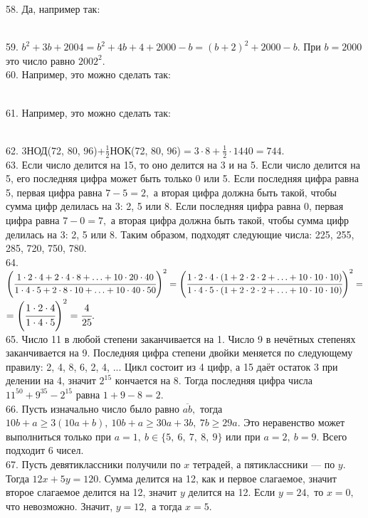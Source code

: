 58. Да, например так:
\begin{figure}[ht!]
\end{figure}\\
59. $b^2+3b+2004=b^2+4b+4+2000-b=(b+2)^2+2000-b.$ При $b=2000$ это число равно $2002^2.$\\
60. Например, это можно сделать так:
\begin{figure}[ht!]
\end{figure}\\
61. Например, это можно сделать так:
\begin{figure}[ht!]
\end{figure}\\
62. 3НОД(72, 80, 96)+$\frac{1}{2}$НОК(72, 80, 96)$=3\cdot8+\frac{1}{2}\cdot1440=744.$\\
63. Если число делится на 15, то оно делится на 3 и на 5. Если число делится на 5, его последняя цифра может быть только 0 или 5. Если последняя цифра равна 5, первая цифра равна $7-5=2,$ а вторая цифра должна быть такой, чтобы сумма цифр делилась на 3: 2, 5 или 8. Если последняя цифра равна 0, первая цифра равна $7-0=7,$ а вторая цифра должна быть такой, чтобы сумма цифр делилась на 3: 2, 5 или 8. Таким образом, подходят следующие числа: 225, 255, 285, 720, 750, 780.\\
64. $\left( \cfrac{1\cdot2\cdot4+2\cdot4\cdot8+\ldots+10\cdot20\cdot40}{1\cdot4\cdot5+2\cdot8\cdot10+\ldots+10\cdot40\cdot50}\right)^2=
\left( \cfrac{1\cdot2\cdot4\cdot(1+2\cdot2\cdot2+\ldots+10\cdot10\cdot10)}{1\cdot4\cdot5\cdot(1+2\cdot2\cdot2+\ldots+10\cdot10\cdot10)}\right)^2=$\\$=
\left( \cfrac{1\cdot2\cdot4}{1\cdot4\cdot5}\right)^2=\cfrac{4}{25}.$\\
65. Число 11 в любой степени заканчивается на 1. Число 9 в нечётных степенях заканчивается на 9. Последняя цифра степени двойки меняется по следующему правилу: 2, 4, 8, 6, 2, 4, ... Цикл состоит из 4 цифр, а 15 даёт остаток 3 при делении на 4, значит $2^{15}$ кончается на 8. Тогда последняя цифра числа $11^{50}+9^{35}-2^{15}$
равна $1+9-8=2.$\\
66. Пусть изначально число было равно  $\overline{ab},$ тогда $10b+a\geqslant3(10a+b),\ 10b+a\geqslant30a+3b,\ 7b\geqslant29a.$ Это неравенство может выполниться только при $a=1,\ b\in\{5,\ 6,\ 7,\ 8,\ 9\}$ или при $a=2,\ b=9.$ Всего подходит 6 чисел.\\
67. Пусть девятиклассники получили по $x$ тетрадей, а пятиклассники --- по $y.$ Тогда $12x+5y=120.$ Сумма делится на 12, как и первое слагаемое, значит второе слагаемое делится на 12, значит $y$ делится на 12. Если $y=24,$ то $x=0,$ что невозможно. Значит, $y=12,$ а тогда $x=5.$\\
